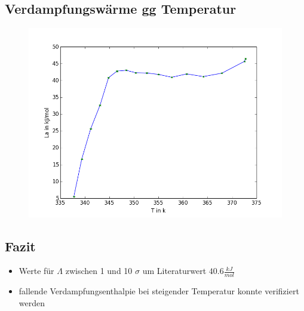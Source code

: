 \documentclass[11pt]{beamer}
\begin{document}
\subsection{Verdampfungswärme gg Temperatur}
\begin{frame}
\begin{figure}[H]
\centering
\includegraphics[scale=0.5]{Bilder/lamda_EL_neuerFehler.png}
\end{figure}
\end{frame}

\subsection{Fazit}
\begin{frame}
\begin{itemize}
\item Werte für $\Lambda$ zwischen 1 und 10 $\sigma$ um Literaturwert $40.6 \frac{kJ}{mol}$
\item fallende Verdampfungsenthalpie bei steigender Temperatur konnte verifiziert werden
\end{itemize}
\end{frame}
\end{document}
